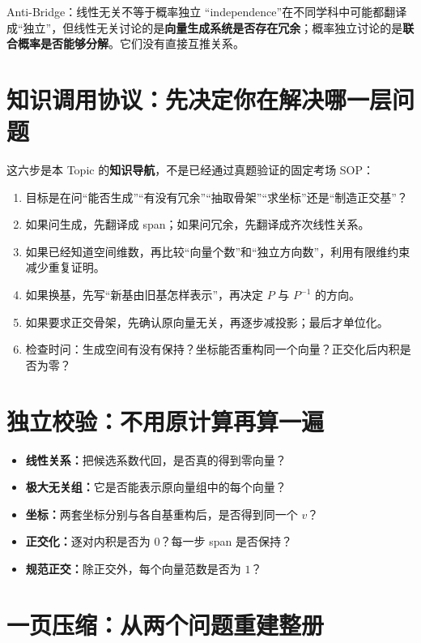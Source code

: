 \documentclass[11pt,a4paper]{ctexart}
\newcommand{\kw}[1]{\textbf{\color{deep}#1}}
\begin{document}
\begin{warnbox}{Anti-Bridge：线性无关不等于概率独立}
“independence”在不同学科中可能都翻译成“独立”，但线性无关讨论的是\kw{向量生成系统是否存在冗余}；概率独立讨论的是\kw{联合概率是否能够分解}。它们没有直接互推关系。
\end{warnbox}

\section{知识调用协议：先决定你在解决哪一层问题}

这六步是本 Topic 的\kw{知识导航}，不是已经通过真题验证的固定考场 SOP：

\begin{enumerate}
  \item 目标是在问“能否生成”“有没有冗余”“抽取骨架”“求坐标”还是“制造正交基”？
  \item 如果问生成，先翻译成 span；如果问冗余，先翻译成齐次线性关系。
  \item 如果已经知道空间维数，再比较“向量个数”和“独立方向数”，利用有限维约束减少重复证明。
  \item 如果换基，先写“新基由旧基怎样表示”，再决定 $P$ 与 $P^{-1}$ 的方向。
  \item 如果要求正交骨架，先确认原向量无关，再逐步减投影；最后才单位化。
  \item 检查时问：生成空间有没有保持？坐标能否重构同一个向量？正交化后内积是否为零？
\end{enumerate}

\section{独立校验：不用原计算再算一遍}

\begin{itemize}
  \item \kw{线性关系：}把候选系数代回，是否真的得到零向量？
  \item \kw{极大无关组：}它是否能表示原向量组中的每个向量？
  \item \kw{坐标：}两套坐标分别与各自基重构后，是否得到同一个 $v$？
  \item \kw{正交化：}逐对内积是否为 $0$？每一步 span 是否保持？
  \item \kw{规范正交：}除正交外，每个向量范数是否为 $1$？
\end{itemize}

\section{一页压缩：从两个问题重建整册}
\end{document}

